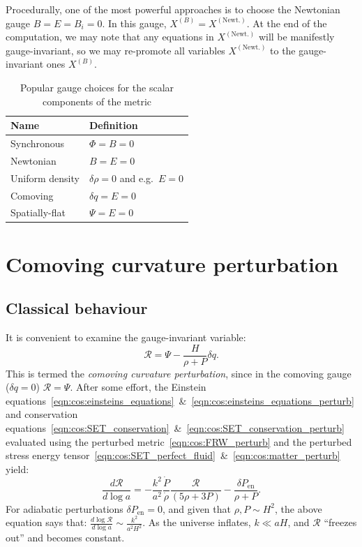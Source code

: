Procedurally, one of  the most powerful approaches is to choose the Newtonian gauge ${B=E=B_i=0}$. In this gauge, $X^{(B)}=X^{(\text{Newt.})}$. At the end of the computation, we may note that any equations in $X^{(\text{Newt.})}$ will be manifestly gauge-invariant, so we may re-promote all variables $X^{(\text{Newt.})}$ to the gauge-invariant ones $X^{(B)}$.


\begin{table}
  \centering
\begin{tabular}{ll}
 \toprule
  Name & Definition \\
 \midrule
 \midrule
 Synchronous & $\Phi=B=0$ \\
 Newtonian & $B=E=0$ \\
 Uniform density & $\delta\rho=0$ and e.g.\ $E=0$ \\
 Comoving & $\delta q = E = 0$ \\
 Spatially-flat & $\Psi=E=0$ \\
 \bottomrule
\end{tabular}
\caption{Popular gauge choices for the scalar components of the metric}\label{tab:cos:gauge_choice}
\end{table}

\section{Comoving curvature perturbation}

\subsection{Classical behaviour}
It is convenient to examine the gauge-invariant variable:
\begin{equation}
  \mathcal{R} = \Psi - \frac{H}{\rho+P}\delta q.
  \label{eqn:cos:CCP}
\end{equation}
This is termed the {\em comoving curvature perturbation}, since in the comoving gauge ($\delta q=0$) $\mathcal{R}=\Psi$.
After some effort, the Einstein equations~\eqref{eqn:cos:einsteins_equations}~\&~\eqref{eqn:cos:einsteins_equations_perturb} and conservation equations~\eqref{eqn:cos:SET_conservation}~\&~\eqref{eqn:cos:SET_conservation_perturb} evaluated using the perturbed metric~\eqref{eqn:cos:FRW_perturb} and the perturbed stress energy tensor~\eqref{eqn:cos:SET_perfect_fluid}~\&~\eqref{eqn:cos:matter_perturb} yield:
\begin{equation}
  \frac{d \mathcal{R}}{d \log a} = 
  -\frac{k^2}{a^2}\frac{\dot{P}}{\dot{\rho}}\frac{\mathcal{R}}{(5\rho + 3P)}
  -\frac{\delta P_\mathrm{en}}{\rho+P}.
\end{equation}
For adiabatic perturbations $\delta P_\mathrm{en}=0$, and given that $\rho,P\sim H^2$, the above equation says that: $\frac{d\log \mathcal{R}}{d\log a} \sim \frac{k^2}{a^2H^2}$. As the universe inflates, $k\ll aH$, and $\mathcal{R}$ ``freezes out'' and becomes constant.

